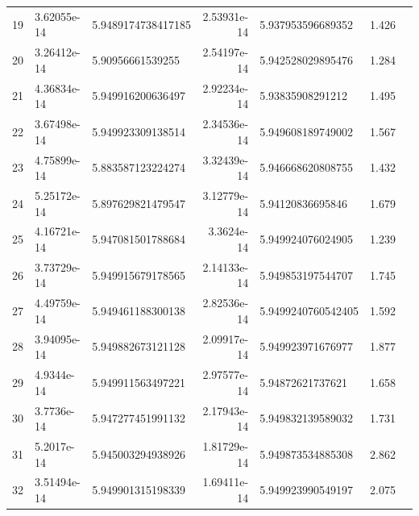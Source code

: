 \begin{tabular}{rllrllr}
19 & 3.62055e-14 & 5.9489174738417185 & 2.53931e-14 & 5.937953596689352 & 1.426\\
20 & 3.26412e-14 & 5.90956661539255 & 2.54197e-14 & 5.942528029895476 & 1.284\\
21 & 4.36834e-14 & 5.949916200636497 & 2.92234e-14 & 5.93835908291212 & 1.495\\
22 & 3.67498e-14 & 5.949923309138514 & 2.34536e-14 & 5.949608189749002 & 1.567\\
23 & 4.75899e-14 & 5.883587123224274 & 3.32439e-14 & 5.946668620808755 & 1.432\\
24 & 5.25172e-14 & 5.897629821479547 & 3.12779e-14 & 5.94120836695846 & 1.679\\
25 & 4.16721e-14 & 5.947081501788684 & 3.3624e-14 & 5.949924076024905 & 1.239\\
26 & 3.73729e-14 & 5.949915679178565 & 2.14133e-14 & 5.949853197544707 & 1.745\\
27 & 4.49759e-14 & 5.949461188300138 & 2.82536e-14 & 5.9499240760542405 & 1.592\\
28 & 3.94095e-14 & 5.949882673121128 & 2.09917e-14 & 5.949923971676977 & 1.877\\
29 & 4.9344e-14 & 5.949911563497221 & 2.97577e-14 & 5.94872621737621 & 1.658\\
30 & 3.7736e-14 & 5.947277451991132 & 2.17943e-14 & 5.949832139589032 & 1.731\\
31 & 5.2017e-14 & 5.945003294938926 & 1.81729e-14 & 5.949873534885308 & 2.862\\
32 & 3.51494e-14 & 5.949901315198339 & 1.69411e-14 & 5.949923990549197 & 2.075\\
\bottomrule
\end{tabular}
